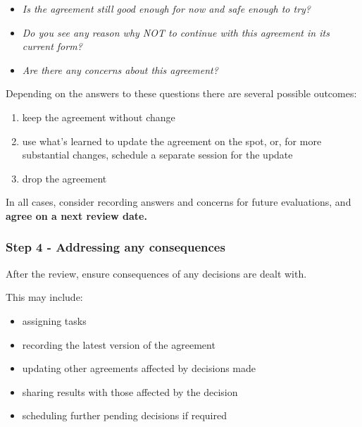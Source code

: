 \begin{itemize}
\item \emph{Is the agreement still good enough for now and safe enough to try?}

\item \emph{Do you see any reason why NOT to continue with this agreement in its current form?}

\item \emph{Are there any concerns about this agreement?}

\end{itemize}

Depending on the answers to these questions there are several possible outcomes:

\begin{enumerate}
\item keep the agreement without change

\item use what's learned to update the agreement on the spot, or, for more substantial changes, schedule a separate session for the update

\item drop the agreement

\end{enumerate}

In all cases, consider recording answers and concerns for future evaluations, and \textbf{agree on a next review date.}

\subsubsection{Step 4 - Addressing any consequences}
\label{step4-addressinganyconsequences}

After the review, ensure consequences of any decisions are dealt with.

This may include:

\begin{itemize}
\item assigning tasks

\item recording the latest version of the agreement

\item updating other agreements affected by decisions made

\item sharing results with those affected by the decision

\item scheduling further pending decisions if required

\end{itemize}

